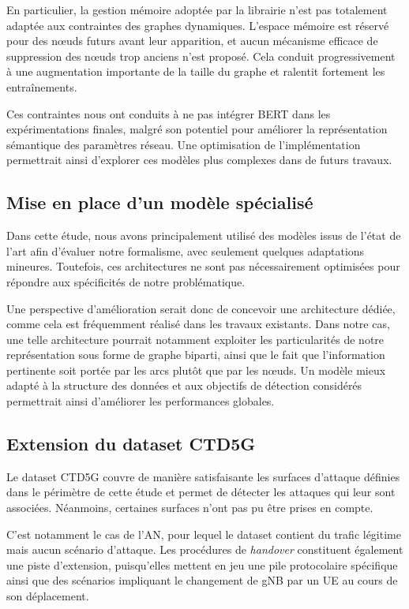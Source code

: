 \documentclass[a4paper,11pt,twoside]{StyleThese}
\begin{document}
En particulier, la gestion mémoire adoptée par la librairie n'est pas totalement adaptée aux contraintes des graphes dynamiques. L'espace mémoire est réservé pour des nœuds futurs avant leur apparition, et aucun mécanisme efficace de suppression des nœuds trop anciens n'est proposé. Cela conduit progressivement à une augmentation importante de la taille du graphe et ralentit fortement les entraînements.

Ces contraintes nous ont conduits à ne pas intégrer BERT dans les expérimentations finales, malgré son potentiel pour améliorer la représentation sémantique des paramètres réseau. Une optimisation de l'implémentation permettrait ainsi d'explorer ces modèles plus complexes dans de futurs travaux.

\subsection{Mise en place d'un modèle spécialisé}
Dans cette étude, nous avons principalement utilisé des modèles issus de l'état de l'art afin d'évaluer notre formalisme, avec seulement quelques adaptations mineures. Toutefois, ces architectures ne sont pas nécessairement optimisées pour répondre aux spécificités de notre problématique.

Une perspective d'amélioration serait donc de concevoir une architecture dédiée, comme cela est fréquemment réalisé dans les travaux existants. Dans notre cas, une telle architecture pourrait notamment exploiter les particularités de notre représentation sous forme de graphe biparti, ainsi que le fait que l'information pertinente soit portée par les arcs plutôt que par les nœuds. Un modèle mieux adapté à la structure des données et aux objectifs de détection considérés permettrait ainsi d'améliorer les performances globales.

\subsection{Extension du dataset CTD5G}
Le dataset CTD5G couvre de manière satisfaisante les surfaces d'attaque définies dans le périmètre de cette étude et permet de détecter les attaques qui leur sont associées. Néanmoins, certaines surfaces n'ont pas pu être prises en compte.

C'est notamment le cas de l'AN, pour lequel le dataset contient du trafic légitime mais aucun scénario d'attaque. Les procédures de \textit{handover} constituent également une piste d'extension, puisqu'elles mettent en jeu une pile protocolaire spécifique ainsi que des scénarios impliquant le changement de gNB par un UE au cours de son déplacement.
\end{document}
